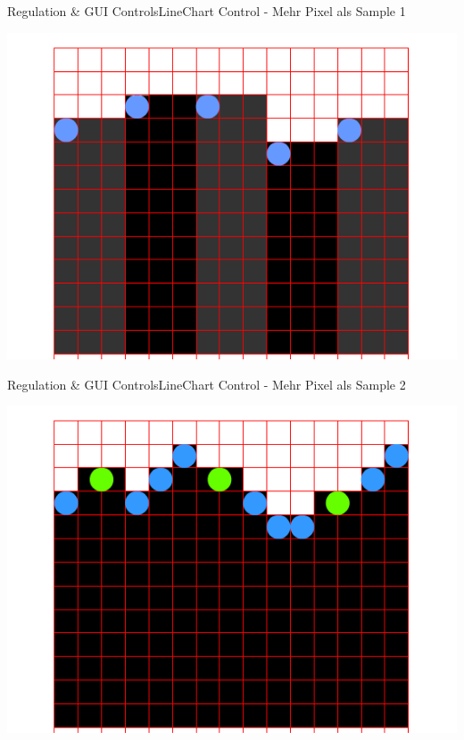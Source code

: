 	\begin{frame}{Regulation \& GUI Controls}{LineChart Control - Mehr Pixel als Sample 1}
	  	\begin{center}			
	  		\includegraphics[width=1.05\textwidth]{../regulation/TooFewSamples01.png}
	  	\end{center}
	\end{frame}

	\begin{frame}{Regulation \& GUI Controls}{LineChart Control - Mehr Pixel als Sample 2}
	\begin{center}			
		\includegraphics[width=1.05\textwidth]{../regulation/TooFewSamples02.png}
	\end{center}
	\end{frame}

